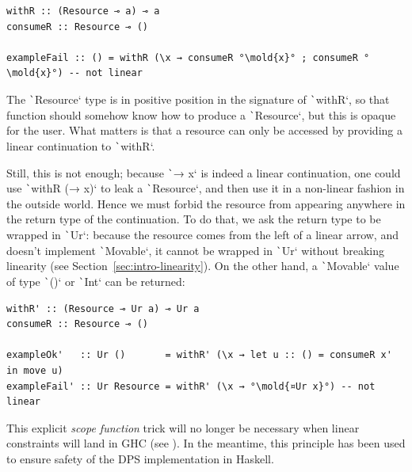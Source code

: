 \documentclass[english]{jflart}
\newcommand{\mold}[1]{\colorbox{red!50}{#1}}
\newlength{\currentparskip}
\newenvironment{unbreakable}
{%
  \setlength{\currentparskip}{\parskip}%
  \setlength{\parskip}{\currentparskip}%
  \par\vspace{0.5\baselineskip}%
  \noindent\begin{minipage}{\textwidth}%
    \setlength{\parskip}{\currentparskip}%
}
{%
  \end{minipage}%
  \par\vspace{0.5\baselineskip}%
}
\begin{document}
\begin{unbreakable}
{\small
\begin{verbatim}
withR :: (Resource ⊸ a) ⊸ a
consumeR :: Resource ⊸ ()

exampleFail :: () = withR (\x → consumeR °\mold{x}° ; consumeR °\mold{x}°) -- not linear
\end{verbatim}
}
\end{unbreakable}

The \texttt`Resource` type is in positive position in the signature of \texttt`withR`, so that function should somehow know how to produce a \texttt`Resource`, but this is opaque for the user. What matters is that a resource can only be accessed by providing a linear continuation to \texttt`withR`.

Still, this is not enough; because \texttt`\x → x` is indeed a linear continuation, one could use \texttt`withR (\x → x)` to leak a \texttt`Resource`, and then use it in a non-linear fashion in the outside world. Hence we must forbid the resource from appearing anywhere in the return type of the continuation. To do that, we ask the return type to be wrapped in \texttt`Ur`: because the resource comes from the left of a linear arrow, and doesn't implement \texttt`Movable`, it cannot be wrapped in \texttt`Ur` without breaking linearity (see Section~\ref{sec:intro-linearity}). On the other hand, a \texttt`Movable` value of type \texttt`()` or \texttt`Int` can be returned:
\begin{unbreakable}
{\small
\begin{verbatim}
withR' :: (Resource ⊸ Ur a) ⊸ Ur a
consumeR :: Resource ⊸ ()

exampleOk'   :: Ur ()       = withR' (\x → let u :: () = consumeR x' in move u)
exampleFail' :: Ur Resource = withR' (\x → °\mold{¤Ur x}°) -- not linear
\end{verbatim}
}
\end{unbreakable}

This explicit \emph{scope function} trick will no longer be necessary when linear constraints will land in GHC (see \cite{spiwack_linearly_2022}). In the meantime, this principle has been used to ensure safety of the DPS implementation in Haskell.

\end{document}
